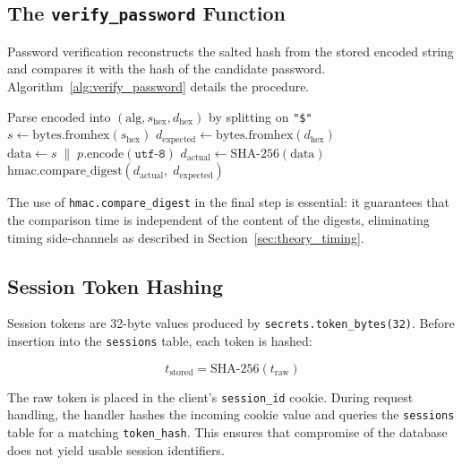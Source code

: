 \subsection{The \texttt{verify\_password} Function}
\label{sec:arch_verify}

Password verification reconstructs the salted hash from the stored encoded string and compares it with the hash of the candidate password. Algorithm~\ref{alg:verify_password} details the procedure.

\begin{algorithm}[H]
\caption{verify\_password($p$, encoded)}
\label{alg:verify_password}
Parse $\text{encoded}$ into $(\text{alg}, s_{\text{hex}}, d_{\text{hex}})$ by splitting on \texttt{"\$"}\;
$s \leftarrow \mathrm{bytes.fromhex}(s_{\text{hex}})$\;
$d_{\text{expected}} \leftarrow \mathrm{bytes.fromhex}(d_{\text{hex}})$\;
$\text{data} \leftarrow s \;\|\; p.\mathrm{encode}(\texttt{utf-8})$\;
$d_{\text{actual}} \leftarrow \mathrm{SHA\text{-}256}(\text{data})$\;
\Return $\mathrm{hmac.compare\_digest}(d_{\text{actual}},\; d_{\text{expected}})$\;
\end{algorithm}

The use of \texttt{hmac.compare\_digest} in the final step is essential: it guarantees that the comparison time is independent of the content of the digests, eliminating timing side-channels as described in Section~\ref{sec:theory_timing}.

\subsection{Session Token Hashing}
\label{sec:arch_session_tokens}

Session tokens are 32-byte values produced by \texttt{secrets.token\_bytes(32)}. Before insertion into the \texttt{sessions} table, each token is hashed:

\begin{equation}
  t_{\text{stored}} = \mathrm{SHA\text{-}256}(t_{\text{raw}})
  \label{eq:session_token_hash}
\end{equation}

The raw token is placed in the client's \texttt{session\_id} cookie. During request handling, the handler hashes the incoming cookie value and queries the \texttt{sessions} table for a matching \texttt{token\_hash}. This ensures that compromise of the database does not yield usable session identifiers.

